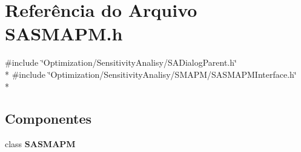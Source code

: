 \section{Referência do Arquivo S\+A\+S\+M\+A\+P\+M.\+h}
\label{_s_a_s_m_a_p_m_8h}
{\ttfamily \#include \char`\"{}Optimization/\+Sensitivity\+Analisy/\+S\+A\+Dialog\+Parent.\+h\char`\"{}}\\*
{\ttfamily \#include \char`\"{}Optimization/\+Sensitivity\+Analisy/\+S\+M\+A\+P\+M/\+S\+A\+S\+M\+A\+P\+M\+Interface.\+h\char`\"{}}\\*
\subsection*{Componentes}
\begin{DoxyCompactItemize}
\item 
class {\bf S\+A\+S\+M\+A\+PM}
\end{DoxyCompactItemize}
